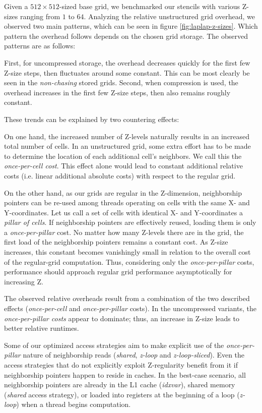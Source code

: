 Given a $512\times 512$-sized base grid, we benchmarked our stencils with various Z-sizes ranging from $1$ to $64$. Analyzing the relative unstructured grid overhead, we observed two main patterns, which can be seen in figure \ref{fig:laplap-z-sizes}. Which pattern the overhead follows depends on the chosen grid storage. The observed patterns are as follows:

First, for uncompressed storage, the overhead decreases quickly for the first few Z-size steps, then fluctuates around some constant. This can be most clearly be seen in the \emph{non-chasing} stored grids. Second, when compression is used, the overhead increases in the first few Z-size steps, then also remains roughly constant.

These trends can be explained by two countering effects:

On one hand, the increased number of Z-levels naturally results in an increased total number of cells. In an unstructured grid, some extra effort has to be made to determine the location of each additional cell's neighbors. We call this the \emph{once-per-cell cost}. This effect alone would lead to constant additional relative costs (i.e. linear additional absolute costs) with respect to the regular grid.

On the other hand, as our grids are regular in the Z-dimension, neighborship pointers can be re-used among threads operating on cells with the same X- and Y-coordinates. Let us call a set of cells with identical X- and Y-coordinates a \emph{pillar of cells}. If neighborship pointers are effectively reused, loading them is only a \emph{once-per-pillar} cost. No matter how many Z-levels there are in the grid, the first load of the neighborship pointers remains a constant cost. As Z-size increases, this constant becomes vanishingly small in relation to the overall cost of the regular-grid computation. Thus, considering only the \emph{once-per-pillar} costs, performance should approach regular grid performance asymptotically for increasing Z. 

The observed relative overheads result from a combination of the two described effects (\emph{once-per-cell} and \emph{once-per-pillar} costs). In the uncompressed variants, the \emph{once-per-pillar costs} appear to dominate; thus, an increase in Z-size leads to better relative runtimes.

Some of our optimized access strategies aim to make explicit use of the \emph{once-per-pillar} nature of neighborship reads (\emph{shared}, \emph{z-loop} and \emph{z-loop-sliced}). Even the access strategies that do not explicitly exploit Z-regularity benefit from it if neighborship pointers happen to reside in caches.  In the best-case scenario, all neighborship pointers are already in the L1 cache (\emph{idxvar}), shared memory (\emph{shared} access strategy), or loaded into registers at the beginning of a loop (\emph{z-loop}) when a thread begins computation.

